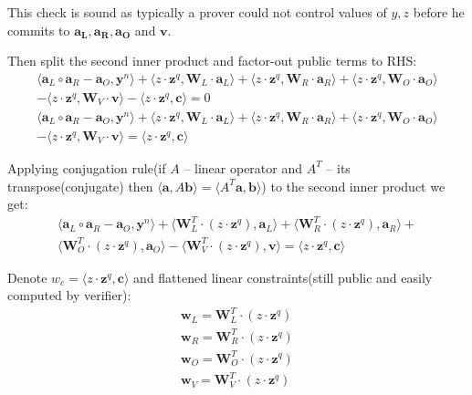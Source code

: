 \documentclass[../lecture-notes-148x210.tex]{subfiles}
\begin{document}
This check is sound as typically a prover could not control values of $y,z$ before he commits to $\mathbf{a_L, a_R, a_O}$ and $\mathbf{v}$.

Then split the second inner product and factor-out public terms to RHS:
\begin{equation*}
    \begin{aligned}
        \langle \mathbf{a}_L \circ \mathbf{a}_R - \mathbf{a}_O, \mathbf{y}^n \rangle + \langle z \cdot \mathbf{z}^q, \mathbf{W}_L \cdot \mathbf{a}_L \rangle + \langle z \cdot \mathbf{z}^q, \mathbf{W}_R \cdot \mathbf{a}_R \rangle + \langle z \cdot \mathbf{z}^q, \mathbf{W}_O \cdot \mathbf{a}_O \rangle \\ 
        - \langle z \cdot \mathbf{z}^q, \mathbf{W}_V \cdot \mathbf{v} \rangle - \langle z \cdot \mathbf{z}^q, \mathbf{c} \rangle = 0 \\
        \langle \mathbf{a}_L \circ \mathbf{a}_R - \mathbf{a}_O, \mathbf{y}^n \rangle + \langle z \cdot \mathbf{z}^q, \mathbf{W}_L \cdot \mathbf{a}_L \rangle + \langle z \cdot \mathbf{z}^q, \mathbf{W}_R \cdot \mathbf{a}_R \rangle + \langle z \cdot \mathbf{z}^q, \mathbf{W}_O \cdot \mathbf{a}_O \rangle \\ 
        - \langle z \cdot \mathbf{z}^q, \mathbf{W}_V \cdot \mathbf{v} \rangle = \langle z \cdot \mathbf{z}^q, \mathbf{c} \rangle
    \end{aligned}
\end{equation*}

Applying conjugation rule(if $A$ -- linear operator and $A^T$ -- its transpose(conjugate) then $\langle \mathbf{a}, A \mathbf{b} \rangle = \langle A^T \mathbf{a}, \mathbf{b} \rangle$) to the second inner product we get:
\begin{equation*}
    \begin{aligned}
        \langle \mathbf{a}_L \circ \mathbf{a}_R - \mathbf{a}_O, \mathbf{y}^n \rangle + \langle \mathbf{W}_L^T \cdot (z \cdot \mathbf{z}^q), \mathbf{a}_L \rangle + \langle \mathbf{W}_R^T \cdot (z \cdot \mathbf{z}^q), \mathbf{a}_R \rangle + \\
        \langle \mathbf{W}_O^T \cdot (z \cdot \mathbf{z}^q), \mathbf{a}_O \rangle - \langle \mathbf{W}_V^T \cdot (z \cdot \mathbf{z}^q), \mathbf{v} \rangle = \langle z \cdot \mathbf{z}^q, \mathbf{c} \rangle
    \end{aligned}
\end{equation*}

Denote $w_c = \langle z \cdot \mathbf{z}^q, \mathbf{c} \rangle$ and flattened linear constraints(still public and easily computed by verifier):
\begin{equation*}
    \begin{aligned}
        \mathbf{w}_L = \mathbf{W}_L^T \cdot (z \cdot \mathbf{z}^q) \\
        \mathbf{w}_R = \mathbf{W}_R^T \cdot (z \cdot \mathbf{z}^q) \\
        \mathbf{w}_O = \mathbf{W}_O^T \cdot (z \cdot \mathbf{z}^q) \\
        \mathbf{w}_V = \mathbf{W}_V^T \cdot (z \cdot \mathbf{z}^q) \\
    \end{aligned}
\end{equation*}
\end{document}
